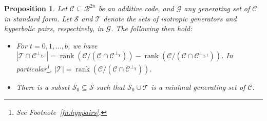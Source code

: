 \documentclass{article}
\DeclareMathOperator{\rank}{rank}
\newtheorem{prop}{Proposition}[section]
\theoremstyle{remark}
\theoremstyle{definition}
\numberwithin{equation}{section}
\begin{document}
\begin{prop}\label{prop:count} 
Let $\mathcal{C} \subseteq \mathcal{R}^{2n}$ be an additive code, and $\mathcal{G}$ any generating set of $\mathcal{C}$ in standard form. Let $\mathcal{S}$ and $\mathcal{T}$ denote the sets of isotropic generators and hyperbolic pairs, respectively, in $\mathcal{G}$. The following then hold:
\begin{itemize}
\item[(a)] For $t = 0,1,\ldots,b$, we have $\left|\mathcal{T} \cap \mathcal{C}^{\perp_{\chi,t}}\right| = \rank(\mathcal{C} / (\mathcal{C} \cap \mathcal{C}^{\perp_{\chi}})) - \rank(\mathcal{C} / (\mathcal{C} \cap \mathcal{C}^{\perp_{\chi,t}}))$. In particular\footnote{See Footnote~\ref{fn:hyppairs}.}, $\left|\mathcal{T}\right| = \rank(\mathcal{C} / (\mathcal{C} \cap \mathcal{C}^{\perp_{\chi}}))$.
\item[(b)] There is a subset $\mathcal{S}_0 \subseteq \mathcal{S}$ such that $\mathcal{S}_0 \cup \mathcal{T}$ is a minimal generating set of $\mathcal{C}$.
\end{itemize}
\end{prop}
\end{document}
